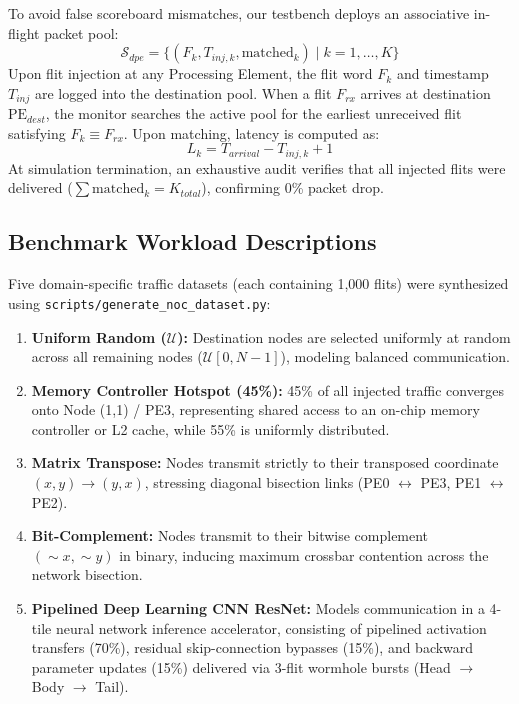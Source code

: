 \documentclass[conference]{IEEEtran}
\begin{document}
To avoid false scoreboard mismatches, our testbench deploys an associative in-flight packet pool:
\begin{equation}
    \mathcal{S}_{dpe} = \{ (F_k, T_{inj, k}, \text{matched}_k) \mid k = 1, \dots, K \}
\end{equation}
Upon flit injection at any Processing Element, the flit word $F_k$ and timestamp $T_{inj}$ are logged into the destination pool. When a flit $F_{rx}$ arrives at destination $\text{PE}_{dest}$, the monitor searches the active pool for the earliest unreceived flit satisfying $F_k \equiv F_{rx}$. Upon matching, latency is computed as:
\begin{equation}
    L_k = T_{arrival} - T_{inj, k} + 1
\end{equation}
At simulation termination, an exhaustive audit verifies that all injected flits were delivered ($\sum \text{matched}_k = K_{total}$), confirming 0\% packet drop.

\subsection{Benchmark Workload Descriptions}
Five domain-specific traffic datasets (each containing 1,000 flits) were synthesized using \texttt{scripts/generate_noc_dataset.py}:
\begin{enumerate}
    \item \textbf{Uniform Random ($\mathcal{U}$):} Destination nodes are selected uniformly at random across all remaining nodes ($\mathcal{U}[0, N-1]$), modeling balanced communication.
    \item \textbf{Memory Controller Hotspot (45\%):} 45\% of all injected traffic converges onto Node (1,1) / PE3, representing shared access to an on-chip memory controller or L2 cache, while 55\% is uniformly distributed.
    \item \textbf{Matrix Transpose:} Nodes transmit strictly to their transposed coordinate $(x,y) \to (y,x)$, stressing diagonal bisection links (PE0 $\leftrightarrow$ PE3, PE1 $\leftrightarrow$ PE2).
    \item \textbf{Bit-Complement:} Nodes transmit to their bitwise complement $(\sim x, \sim y)$ in binary, inducing maximum crossbar contention across the network bisection.
    \item \textbf{Pipelined Deep Learning CNN ResNet:} Models communication in a 4-tile neural network inference accelerator, consisting of pipelined activation transfers (70\%), residual skip-connection bypasses (15\%), and backward parameter updates (15\%) delivered via 3-flit wormhole bursts (Head $\to$ Body $\to$ Tail).
\end{enumerate}
\end{document}

